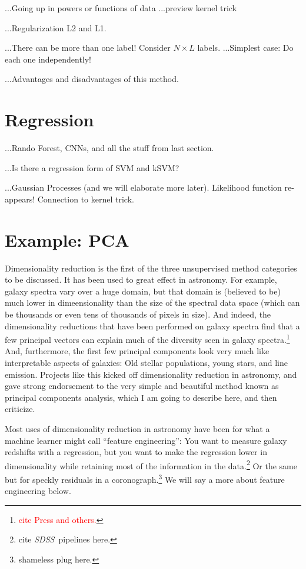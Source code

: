 \documentclass[12pt, twoside, letterpaper]{article}
\newcommand{\acronym}[1]{{\small{#1}}}
\newcommand{\project}[1]{\textsl{#1}}
\newcommand{\SDSS}{\project{\acronym{SDSS}}}
\newcommand{\todo}[1]{\textcolor{red}{#1}}  %
\begin{document}
...Going up in powers or functions of data
...preview kernel trick

...Regularization L2 and L1.

...There can be more than one label! Consider $N\times L$ labels.
...Simplest case: Do each one independently!

...Advantages and disadvantages of this method.

\section{Regression}

...Rando Forest, CNNs, and all the stuff from last section.

...Is there a regression form of SVM and kSVM?

...Gaussian Processes (and we will elaborate more later).
Likelihood function re-appears!
Connection to kernel trick.

\section{Example: PCA}

Dimensionality reduction is the first of the three unsupervised
method categories to be discussed.
It has been used to great effect in astronomy.
For example, galaxy spectra vary over a huge domain, but that
domain is (believed to be) much lower in dimeensionality than the size
of the spectral data space (which can be thousands or even tens of
thousands of pixels in size).
And indeed, the dimensionality reductions that have been performed on
galaxy spectra find that a few principal vectors can explain much of
the diversity seen in galaxy spectra.\footnote{\todo{cite Press and
    others.}}
And, furthermore, the first few principal components look very much
like interpretable aspects of galaxies: Old stellar populations, young
stars, and line emission.
Projects like this kicked off dimensionality reduction in astronomy,
and gave strong endorsement to the very simple and beautiful method
known as principal components analysis, which I am going to describe
here, and then criticize.

Most uses of dimensionality reduction in astronomy have been for 
what a machine learner might call ``feature engineering'': You want
to measure galaxy redshifts with a regression, but you want to make the regression
lower in dimensionality while retaining most of the information
in the data.\footnote{cite \SDSS\ pipelines here.}
Or the same but for speckly residuals in a coronograph.\footnote{shameless plug here.}
We will say a more about feature engineering below.
\end{document}
